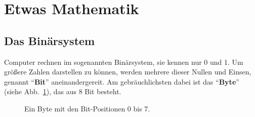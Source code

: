 \section{Etwas Mathematik}
\label{sec:etwas-mathematik}

\subsection{Das Binärsystem}
\label{sec:etwas-mathematik:binärsystem}

Computer rechnen im sogenannten Binärsystem, sie kennen nur 0 und 1. Um größere Zahlen darstellen zu können, werden mehrere dieser Nullen und Einsen, genannt ``\textbf{Bit}'' aneinandergereit. Am gebräuchlichsten dabei ist das ``\textbf{Byte}'' (siehe Abb.~\ref{fig:byte_bits}), das aus 8 Bit besteht.

\begin{figure}[h]
  \centering
  \caption{Ein Byte mit den Bit-Positionen 0 bis 7.}
  \label{fig:byte_bits}
\end{figure}

